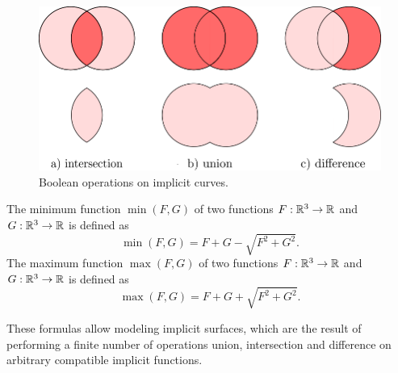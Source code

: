 \begin{figure}[h!]
    \centerline{\includegraphics[scale=0.5]{images/img19}}
    \caption[Boolean operations on implicit curves]
    {Boolean operations on implicit curves.}
    \label{img:19}
\end{figure}

\begin{theorem}
    The minimum function $\min(F, G)$ of two functions $F:\mathbb{R}^3 \to \mathbb{R}$ and
    $G:\mathbb{R}^3 \to \mathbb{R}$ is defined as $$\min(F, G) = F + G - \sqrt{F^2+G^2}.$$
    The maximum function $\max(F, G)$ of two functions $F:\mathbb{R}^3 \to \mathbb{R}$ and
    $G:\mathbb{R}^3 \to \mathbb{R}$ is defined as $$\max(F, G) = F + G + \sqrt{F^2+G^2}.$$
\end{theorem}

These formulas allow modeling implicit surfaces, which are the result of
performing a finite number of operations union, intersection and difference
on arbitrary compatible implicit functions.

